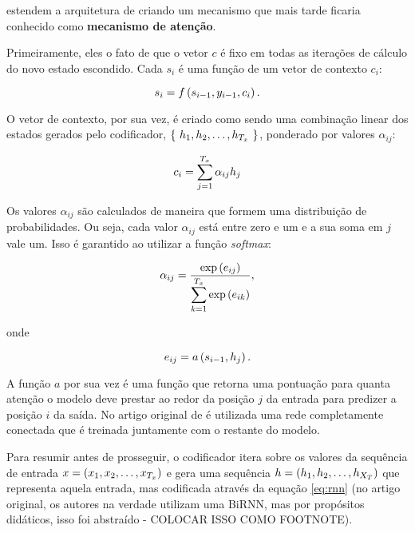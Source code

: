 \cite{bahdanau-etal:2014:attention-mechanism} estendem a arquitetura de
\cite{cho-etal:2014:rnn-encoder-decoder} criando um mecanismo que mais tarde
ficaria conhecido como \textbf{mecanismo de atenção}.

Primeiramente, eles o fato de que o vetor $c$ é fixo em todas as iterações de
cálculo do novo estado escondido. Cada $s_i$ é uma função de um vetor de
contexto $c_i$:

\begin{equation}
  s_i=f\paren{s_{i-1},y_{i-1},c_i}.
\end{equation}

O vetor de contexto, por sua vez, é criado como sendo uma combinação linear dos
estados gerados pelo codificador, $\set{\seq{h}{T_x}}$, ponderado por valores
$\alpha_{ij}$:

\begin{equation}
  c_i=\spsum{j=1}{T_x}\alpha_{ij}h_j
  \label{eq:attention}
\end{equation}

Os valores $\alpha_{ij}$ são calculados de maneira que formem uma distribuição
de probabilidades. Ou seja, cada valor $\alpha_{ij}$ está entre zero e um e a
sua soma em $j$ vale um. Isso é garantido ao utilizar a função \textit{softmax}:

\begin{equation}
  \alpha_{ij}=\dfrac{\exp\paren{e_{ij}}}
  {\spsum{k=1}{T_x}\exp\paren{e_{ik}}},
\end{equation}

onde

\begin{equation}
  e_{ij}=a\paren{s_{i-1},h_j}.
\end{equation}

A função $a$ por sua vez é uma função que retorna uma pontuação para quanta
atenção o modelo deve prestar ao redor da posição $j$ da entrada para predizer a
posição $i$ da saída. No artigo original de
\cite{bahdanau-etal:2014:attention-mechanism} é utilizada uma rede completamente
conectada que é treinada juntamente com o restante do modelo.

Para resumir antes de prosseguir, o codificador itera sobre os valores da
sequência de entrada $x=\paren{\seq{x}{T_x}}$ e gera uma sequência
$h=\paren{\seq{h}{X_T}}$ que representa aquela entrada, mas codificada através
da equação \ref{eq:rnn} (no artigo original, os autores na verdade utilizam uma
BiRNN, mas por propósitos didáticos, isso foi abstraído - COLOCAR ISSO COMO
FOOTNOTE).

